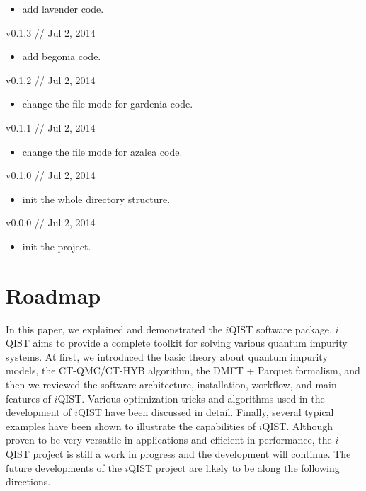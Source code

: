\begin{itemize}
\item add lavender code.
\end{itemize}


v0.1.3 // Jul 2, 2014

\begin{itemize}
\item add begonia code.
\end{itemize}


v0.1.2 // Jul 2, 2014

\begin{itemize}
\item change the file mode for gardenia code.
\end{itemize}


v0.1.1 // Jul 2, 2014

\begin{itemize}
\item change the file mode for azalea code.
\end{itemize}


v0.1.0 // Jul 2, 2014

\begin{itemize}
\item init the whole directory structure.
\end{itemize}


v0.0.0 // Jul 2, 2014

\begin{itemize}
\item init the project.
\end{itemize}

\section{Roadmap}

In this paper, we explained and demonstrated the $i$QIST software package. $i$QIST aims to provide a complete toolkit for solving various quantum impurity systems. At first, we introduced the basic theory about quantum impurity models, the CT-QMC/CT-HYB algorithm, the DMFT + Parquet formalism, and then we reviewed the software architecture, installation, workflow, and main features of $i$QIST. Various optimization tricks and algorithms used in the development of $i$QIST have been discussed in detail. Finally, several typical examples have been shown to illustrate the capabilities of $i$QIST. Although proven to be very versatile in applications and efficient in performance, the $i$QIST project is still a work in progress and the development will continue. The future developments of the $i$QIST project are likely to be along the following directions.

